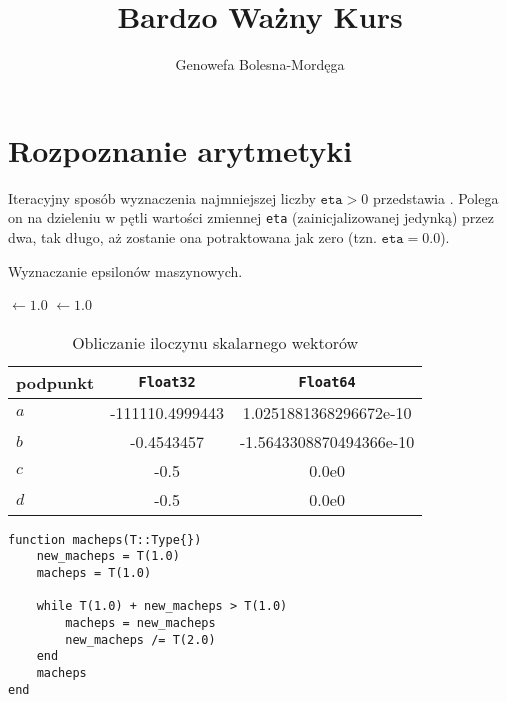 \documentclass[zadania, 12pt, oneside]{mk-polish-lab-report}
\author{Genowefa Bolesna-Mordęga}
\title{Bardzo Ważny Kurs}
\begin{document}
\maketitle

\section{Rozpoznanie arytmetyki}

Iteracyjny sposób wyznaczenia najmniejszej liczby $\mathtt{eta} > 0$ przedstawia . Polega on na dzieleniu w pętli wartości zmiennej \texttt{eta} (zainicjalizowanej jedynką) przez dwa, tak długo, aż zostanie ona potraktowana jak zero (tzn. $\mathtt{eta} = 0.0$).

\begin{algorithm}[h]
\caption{Wyznaczanie epsilonów maszynowych.}
\label{alg:macheps}

\Macheps $\leftarrow 1.0$\;
\NMacheps $\leftarrow 1.0$\;
\Return \Macheps
\end{algorithm}

\lipsum[1-2]

	\begin{table}[!h]
        \centering
        \footnotesize
		\begin{tabular}{lSS}
		\toprule
			{podpunkt} & {\texttt{Float32}} & {\texttt{Float64}} \\ \midrule
			$a$ & -111110.4999443 & 1.0251881368296672e-10 \\ 
 			$b$ & -0.4543457 & -1.5643308870494366e-10 \\
 			$c$ & -0.5 & 0.0e0 \\
 			$d$ & -0.5 & 0.0e0 \\\bottomrule
 		\end{tabular}
 		\caption{Obliczanie iloczynu skalarnego wektorów}
		\label{table:8}
	\end{table}	


\lipsum[3-5]
\newpage

\lipsum[3-5]

\begin{lstlisting}[caption=podpis, label=code:example]
function macheps(T::Type{})
    new_macheps = T(1.0)
    macheps = T(1.0)

    while T(1.0) + new_macheps > T(1.0)
        macheps = new_macheps
        new_macheps /= T(2.0)
    end
    macheps
end
\end{lstlisting}

\end{document}
